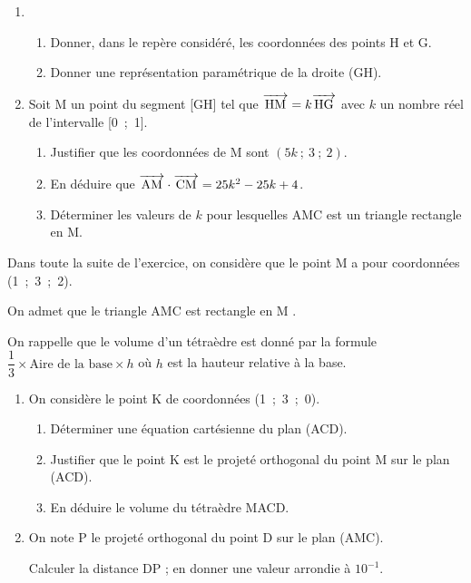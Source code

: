 \documentclass[11pt]{article}
\newcommand{\vect}[1]{\overrightarrow{\,\mathstrut#1\,}}
\begin{document}
\begin{enumerate}
\item 
	\begin{enumerate}
		\item Donner, dans le repère considéré, les coordonnées des points H et G.
		\item Donner une représentation paramétrique de la droite (GH).
	\end{enumerate}	
\item Soit M un point du segment [GH] tel que $\vect{\text{HM}} =k\vect{\text{HG}}$ avec $k$ un nombre réel de l'intervalle [0~;~1].
	\begin{enumerate}
		\item Justifier que les coordonnées de M sont $(5k~;~3~;~2)$.
		\item En déduire que $\vect{\text{AM}} \cdot \vect{\text{CM}} = 25k^2  - 25k + 4$.
		\item Déterminer les valeurs de $k$ pour lesquelles AMC est un triangle rectangle en
M.
	\end{enumerate}
\end{enumerate}	

Dans toute la suite de l'exercice, on considère que le point M a pour coordonnées (1~;~3~;~2).

On admet que le triangle AMC est rectangle en M .

On rappelle que le volume d'un tétraèdre est donné par la formule $\dfrac13 \times\text{Aire de la base}  \times h$ où $h$ est la hauteur relative à la base.

\begin{enumerate}[resume]
\item On considère le point K de coordonnées (1~;~3~;~0).
	\begin{enumerate}
		\item Déterminer une équation cartésienne du plan (ACD).
		\item Justifier que le point K est le projeté orthogonal du point M sur le plan (ACD).
		\item En déduire le volume du tétraèdre MACD.
	\end{enumerate}	
\item On note P le projeté orthogonal du point D sur le plan (AMC).

Calculer la distance DP ; en donner une valeur arrondie à $10^{-1}$.
\end{enumerate}
\end{document}
